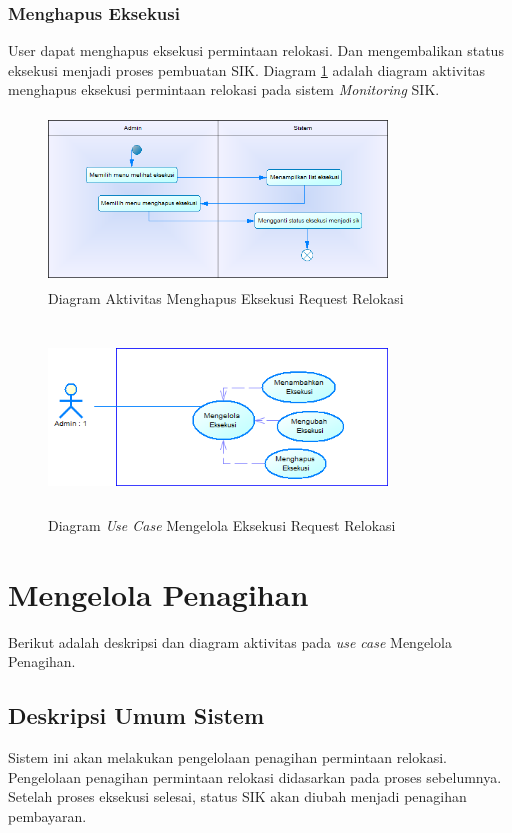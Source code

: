 	\subsubsection{Menghapus Eksekusi}
	User dapat menghapus eksekusi permintaan relokasi. Dan mengembalikan status eksekusi menjadi proses pembuatan SIK. Diagram \ref{figure:activity_menghapus_eksekusi} adalah diagram aktivitas menghapus eksekusi permintaan relokasi pada sistem \textit{Monitoring} SIK.
	\begin{figure}[h]
	\centerline {\includegraphics[width=9cm,height=4.5cm]{bab4/ActivityDiagram_MenghapusEksekusi.png}}
	\caption{Diagram Aktivitas Menghapus Eksekusi Request Relokasi}
	\label{figure:activity_menghapus_eksekusi}
	\end{figure}		

	\begin{figure}[h]
	\centerline {\includegraphics[width=9cm,height=5cm]{bab4/use-case-mengelola-eksekusi.png}}
	\caption{Diagram \textit{Use Case} Mengelola Eksekusi Request Relokasi}
	\label{figure:use_case_mengelola_eksekusi}
	\end{figure}

\section{Mengelola Penagihan}
Berikut adalah deskripsi dan diagram aktivitas pada \textit{use case} Mengelola Penagihan.
\subsection{Deskripsi Umum Sistem}
\tab Sistem ini akan melakukan pengelolaan penagihan permintaan relokasi. Pengelolaan penagihan permintaan relokasi didasarkan pada proses sebelumnya. Setelah proses eksekusi selesai, status SIK akan diubah menjadi penagihan pembayaran.
